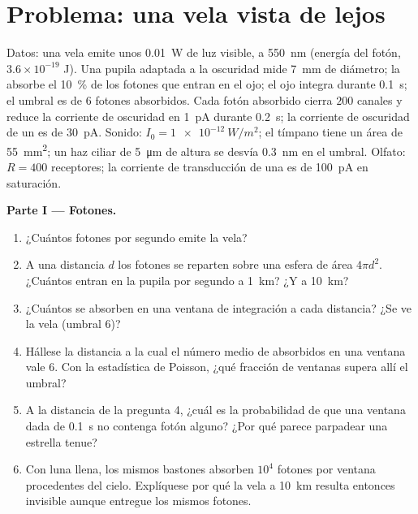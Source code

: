 \section{Problema: una vela vista de lejos}

\begin{problem}
\label{pb:b3:sensory-systems:1}
Datos: una vela emite unos \qty{0.01}{W} de luz visible, a
\qty{550}{nm} (energía del fotón, $3.6\times 10^{-19}$ J). Una pupila
adaptada a la oscuridad mide \qty{7}{mm} de diámetro; la 
absorbe el \qty{10}{\%} de los fotones que entran en el ojo; el ojo
integra durante \qty{0.1}{s}; el umbral es de $6$ fotones absorbidos.
Cada fotón absorbido cierra $200$ canales y reduce la corriente de
oscuridad en \qty{1}{pA} durante \qty{0.2}{s}; la corriente de
oscuridad de un  es de \qty{30}{pA}. Sonido: $I_{0} =
\qty{1e-12}{W/m^2}$; el tímpano tiene un área de \qty{55}{mm^2}; un haz
ciliar de \qty{5}{\micro m} de altura se desvía \qty{0.3}{nm} en el
umbral. Olfato: $R = 400$ receptores; la corriente de transducción de
una  es de \qty{100}{pA} en saturación.

\medskip
\noindent\textbf{Parte I --- Fotones.}
\begin{enumerate}
  \item ¿Cuántos fotones por segundo emite la vela?
  \item A una distancia $d$ los fotones se reparten sobre una esfera de
        área $4\pi d^{2}$. ¿Cuántos entran en la pupila por segundo a
        \qty{1}{km}? ¿Y a \qty{10}{km}?
  \item ¿Cuántos se absorben en una ventana de integración a cada
        distancia? ¿Se ve la vela (umbral $6$)?
  \item Hállese la distancia a la cual el número medio de absorbidos en
        una ventana vale $6$. Con la estadística de Poisson, ¿qué
        fracción de ventanas supera allí el umbral?
  \item A la distancia de la pregunta 4, ¿cuál es la probabilidad de
        que una ventana dada de \qty{0.1}{s} no contenga fotón alguno?
        ¿Por qué parece parpadear una estrella tenue?
  \item Con luna llena, los mismos bastones absorben $10^{4}$ fotones
        por ventana procedentes del cielo. Explíquese por qué la vela a
        \qty{10}{km} resulta entonces invisible aunque entregue los
        mismos fotones.
\end{enumerate}


\end{problem}
